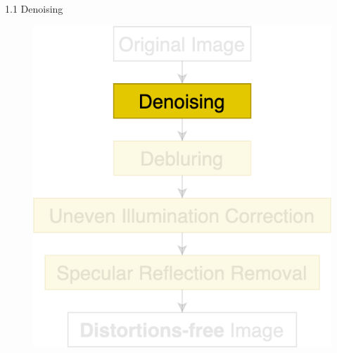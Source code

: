 \documentclass{libs/ufc_format}
\begin{document}
\begin{frame}{ 1.1 Denoising}
    \begin{figure}
        \includegraphics[scale=0.25]{libs/stage1.1.png}
    \end{figure}
\end{frame}

\end{document}
